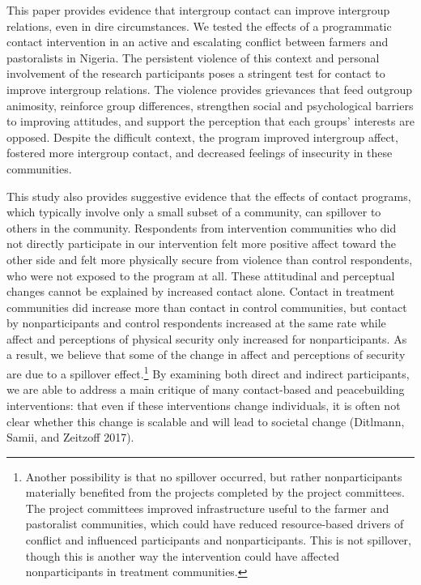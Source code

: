 \documentclass[11pt]{article}
\begin{document}
This paper provides evidence that intergroup contact can improve
intergroup relations, even in dire circumstances. We tested the effects
of a programmatic contact intervention in an active and escalating
conflict between farmers and pastoralists in Nigeria. The persistent
violence of this context and personal involvement of the research
participants poses a stringent test for contact to improve intergroup
relations. The violence provides grievances that feed outgroup
animosity, reinforce group differences, strengthen social and
psychological barriers to improving attitudes, and support the
perception that each groups' interests are opposed. Despite the
difficult context, the program improved intergroup affect, fostered more
intergroup contact, and decreased feelings of insecurity in these
communities.

This study also provides suggestive evidence that the effects of contact
programs, which typically involve only a small subset of a community,
can spillover to others in the community. Respondents from intervention
communities who did not directly participate in our intervention felt
more positive affect toward the other side and felt more physically
secure from violence than control respondents, who were not exposed to
the program at all. These attitudinal and perceptual changes cannot be
explained by increased contact alone. Contact in treatment communities
did increase more than contact in control communities, but contact by
nonparticipants and control respondents increased at the same rate while
affect and perceptions of physical security only increased for
nonparticipants. As a result, we believe that some of the change in
affect and perceptions of security are due to a spillover
effect.\footnote{Another possibility is that no spillover occurred, but
  rather nonparticipants materially benefited from the projects
  completed by the project committees. The project committees improved
  infrastructure useful to the farmer and pastoralist communities, which
  could have reduced resource-based drivers of conflict and influenced
  participants and nonparticipants. This is not spillover, though this
  is another way the intervention could have affected nonparticipants in
  treatment communities.} By examining both direct and indirect
participants, we are able to address a main critique of many
contact-based and peacebuilding interventions: that even if these
interventions change individuals, it is often not clear whether this
change is scalable and will lead to societal change (Ditlmann, Samii,
and Zeitzoff 2017).
\end{document}
